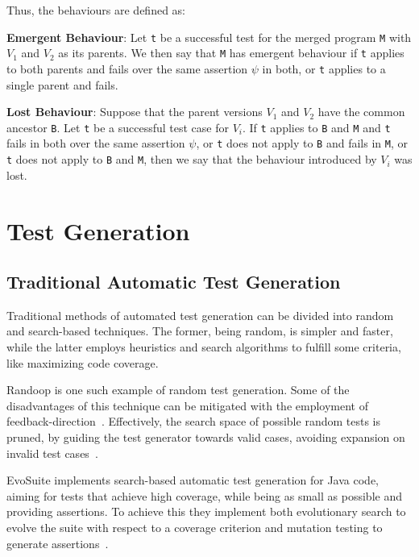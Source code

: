 Thus, the behaviours are defined as:

\textbf{Emergent Behaviour}: Let \texttt{t} be a successful test for the merged program \texttt{M} with \texttt{$V_{1}$}
and \texttt{$V_{2}$} as its parents. We then say that \texttt{M} has emergent behaviour if \texttt{t} applies to both
parents and fails over the same assertion \texttt{$\psi$} in both, or \texttt{t} applies to a single parent and fails.

\textbf{Lost Behaviour}: Suppose that the parent versions \texttt{$V_{1}$} and \texttt{$V_{2}$} have the common ancestor \texttt{B}.
Let \texttt{t} be a successful test case for \texttt{$V_{i}$}.
If \texttt{t} applies to \texttt{B} and \texttt{M} and \texttt{t} fails in both over the same assertion \texttt{$\psi$}, or \texttt{t} does not apply to \texttt{B} and fails in \texttt{M},
or \texttt{t} does not apply to \texttt{B} and \texttt{M}, then we say that the behaviour introduced by \texttt{$V_{i}$} was lost.


\section{Test Generation}

\subsection{Traditional Automatic Test Generation}

Traditional methods of automated test generation can be divided into random and search-based techniques. The former, being random, is simpler and faster, while the latter employs heuristics and search algorithms to fulfill some criteria, like maximizing code coverage.

Randoop is one such example of random test generation. Some of the disadvantages of this technique can be mitigated with the employment of feedback-direction~\cite{kn:randoop}. Effectively, the search space of possible random tests is pruned, by guiding the test generator towards valid cases, avoiding expansion on invalid test cases~\cite{kn:randoop}.

EvoSuite implements search-based automatic test generation for Java code, aiming for tests that achieve high coverage, while being as small as possible and providing assertions. To achieve this they implement both evolutionary search to evolve the suite with respect to a coverage criterion and mutation testing to generate assertions~\cite{kn:evosuite}.

